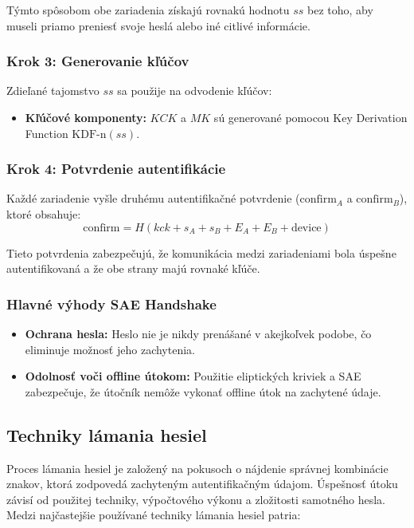\documentclass[12pt, twoside]{book}
\begin{document}
Týmto spôsobom obe zariadenia získajú rovnakú hodnotu \( ss \) bez toho, aby museli priamo preniesť svoje heslá alebo iné citlivé informácie.

\subsubsection{Krok 3: Generovanie kľúčov}
Zdieľané tajomstvo \( ss \) sa použije na odvodenie kľúčov:
\begin{itemize}
    \item \textbf{Kľúčové komponenty:} \( KCK \) a \( MK \) sú generované pomocou Key Derivation Function \( \text{KDF-n}(ss) \).
\end{itemize}

\subsubsection{Krok 4: Potvrdenie autentifikácie}

Každé zariadenie vyšle druhému autentifikačné potvrdenie (\( \text{confirm}_A \) a \( \text{confirm}_B \)), ktoré obsahuje:
\[
\text{confirm} = H(kck + s_A + s_B + E_A + E_B + \text{device})
\]

Tieto potvrdenia zabezpečujú, že komunikácia medzi zariadeniami bola úspešne autentifikovaná a že obe strany majú rovnaké kľúče.

\subsubsection{Hlavné výhody SAE Handshake}
\begin{itemize}
    \item \textbf{Ochrana hesla:} Heslo nie je nikdy prenášané v akejkoľvek podobe, čo eliminuje možnosť jeho zachytenia.
    \item \textbf{Odolnosť voči offline útokom:} Použitie eliptických kriviek a SAE zabezpečuje, že útočník nemôže vykonať offline útok na zachytené údaje.
\end{itemize}


\subsection{Techniky lámania hesiel}
Proces lámania hesiel je založený na pokusoch o nájdenie správnej kombinácie znakov, ktorá zodpovedá zachyteným autentifikačným údajom. Úspešnosť útoku závisí od použitej techniky, výpočtového výkonu a zložitosti samotného hesla. Medzi najčastejšie používané techniky lámania hesiel patria:
\end{document}
